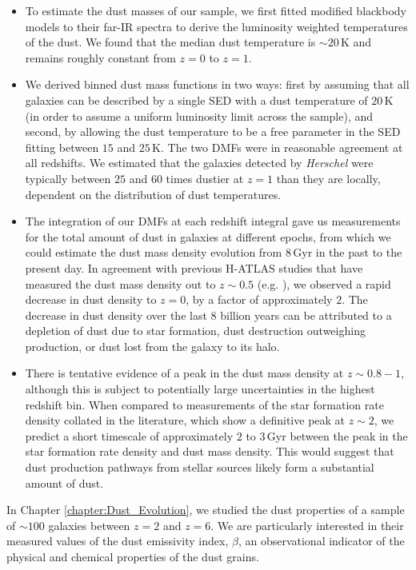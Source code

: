 \begin{itemize}
    \item To estimate the dust masses of our sample, we first fitted modified blackbody models to their far-IR spectra to derive the luminosity weighted temperatures of the dust. We found that the median dust temperature is $\sim20\,$K and remains roughly constant from $z = 0$ to $z = 1$.
    \item We derived binned dust mass functions in two ways: first by assuming that all galaxies can be described by a single SED with a dust temperature of $20\,$K (in order to assume a uniform luminosity limit across the sample), and second, by allowing the dust temperature to be a free parameter in the SED fitting between $15$ and $25\,$K. The two DMFs were in reasonable agreement at all redshifts. We estimated that the galaxies detected by \textit{Herschel} were typically between $25$ and $60$ times dustier at $z = 1$ than they are locally, dependent on the distribution of dust temperatures.
    \item The integration of our DMFs at each redshift integral gave us measurements for the total amount of dust in galaxies at different epochs, from which we could estimate the dust mass density evolution from $8\,$Gyr in the past to the present day. In agreement with previous H-ATLAS studies that have measured the dust mass density out to $z\sim0.5$ (e.g. \citealt{Dunne_2011}), we observed a rapid decrease in dust density to $z = 0$, by a factor of approximately $2$. The decrease in dust density over the last $8$ billion years can be attributed to a depletion of dust due to star formation, dust destruction outweighing production, or dust lost from the galaxy to its halo.
    \item There is tentative evidence of a peak in the dust mass density at $z\sim0.8 - 1$, although this is subject to potentially large uncertainties in the highest redshift bin. When compared to measurements of the star formation rate density collated in the literature, which show a definitive peak at $z\sim2$, we predict a short timescale of approximately $2$ to $3\,$Gyr between the peak in the star formation rate density and dust mass density. This would suggest that dust production pathways from stellar sources likely form a substantial amount of dust.
\end{itemize}

In Chapter \ref{chapter:Dust_Evolution}, we studied the dust properties of a sample of $\sim 100$ galaxies between $z = 2$ and $z = 6$. We are particularly interested in their measured values of the dust emissivity index, $\beta$, an observational indicator of the physical and chemical properties of the dust grains.

